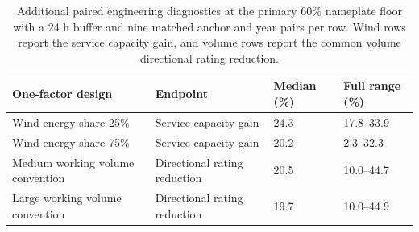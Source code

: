 \begin{table}[H]
\caption{Additional paired engineering diagnostics at the primary 60\% nameplate floor with a 24 h buffer and nine matched anchor and year pairs per row. Wind rows report the service capacity gain, and volume rows report the common volume directional rating reduction.\label{tab:boundaries}}
\begin{tabularx}{\textwidth}{@{}J{1.20} J{1.20} K{0.80} K{0.80}@{}}
\toprule
\textbf{One-factor design} & \textbf{Endpoint} & \textbf{Median (\%)} & \textbf{Full range (\%)}\\
\midrule
Wind energy share 25\% & Service capacity gain & 24.3 & 17.8--33.9\\
Wind energy share 75\% & Service capacity gain & 20.2 & 2.3--32.3\\
Medium working volume convention & Directional rating reduction & 20.5 & 10.0--44.7\\
Large working volume convention & Directional rating reduction & 19.7 & 10.0--44.9\\
\bottomrule
\end{tabularx}
\end{table}
